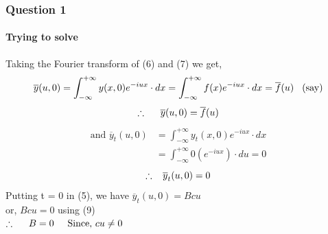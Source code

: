 \documentclass[9 pt]{beamer}
\begin{document}
\begin{frame}[fragile]
	\frametitle{Question 1}
	\framesubtitle{Trying to solve}
	Taking the Fourier transform of (6) and (7) we get,
	$$\overline{y}(u,0)=\int_{-\infty}^{+\infty}y(x,0)e^{-iux}\cdot dx=\int_{-\infty}^{+\infty}f(x)e^{-iux}\cdot dx=\overline{f}(u)\hspace{0.3cm} \textrm{(say)} $$
	\begin{equation}
		\therefore\hspace{0.5cm}\overline{y}(u,0)=\overline{f}(u)
	\end{equation}
	\begin{align*}
		\textrm{and } \overline{y}_t(u,0) & =\int_{-\infty}^{+\infty}y_t(x,0)e^{-iux}\cdot dx \\
		                                  & =\int_{-\infty}^{+\infty}0(e^{-iux})\cdot du=0
	\end{align*}
	\begin{equation}
		\therefore \hspace{0.3cm}\overline{y}_t(u,0)=0
	\end{equation}
	Putting t = 0 in (5), we have $\overline{y}_t(u,0)=Bcu$ \\
	or, $Bcu=0$ using (9) \\
	\hspace{2cm}$\therefore\hspace{0.5cm} B=0 \hspace{0.5cm} \textrm{Since, }cu \neq 0$ \\
	\transwipe[duration=0.6]
\end{frame}
\end{document}
